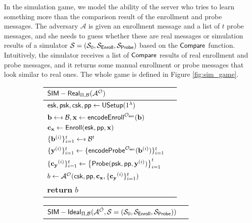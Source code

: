 In the simulation game, we model the ability of the server who tries to learn something more than the comparison result of the enrollment and probe messages. The adversary $\mathcal{A}$ is given an enrollment message and a list of $t$ probe messages, and she needs to guess whether these are real messages or simulation results of a simulator $\mathcal{S} = (\mathcal{S}_0, \mathcal{S}_{\sf Enroll}, \mathcal{S}_{\sf Probe})$ based on the $\sf Compare$ function. Intuitively, the simulator receives a list of $\sf Compare$ results of real enrollment and probe messages, and it returns some manual enrollment or probe messages that look similar to real ones. The whole game is defined in Figure \ref{fig:sim_game}.

\begin{figure}[h]
	\begin{center}

		\begin{subfigure}[t]{0.49\textwidth}
		\begin{tabular}{l c}
			${\sf SIM-Real}_{\Pi, \mathcal{B}}(\mathcal{A}^\mathcal{O})$\\

			\hline

			${\sf esk}, {\sf psk}, {\sf csk}, {\sf pp} \gets {\sf USetup}(1^\lambda)$ \\

			$ \mathbf{b} \getsdollar \mathcal{B}, \mathbf{x} \gets {\sf encodeEnroll}^{\mathcal{O}_{\sf aux}}(\mathbf{b})$ \\

			$\mathbf{c_x} \gets {\sf Enroll}({\sf esk}, {\sf pp}, \mathbf{x})$ \\

			$\{ \mathbf{b}^{(i)} \}_{i=1}^t \getsdollar \mathcal{B}^t$ \\ 

			$\{\mathbf{y}^{(i)}\}_{i=1}^t \gets \{{\sf encodeProbe}^{\mathcal{O}_{\sf aux}}(\mathbf{b}^{(i)})\}_{i=1}^t $ \\
			
			$\{ \mathbf{c_y}^{(i)} \}_{i=1}^t \gets \left\{ {\sf Probe}( {\sf psk}, {\sf pp}, \mathbf{y}^{(i)} ) \right \}_{i=1}^t$ \\

			$b \gets \mathcal{A}^{\mathcal{O}} ({\sf csk}, {\sf pp}, \mathbf{c_x}, \{\mathbf{c_y}^{(i)}\}_{i=1}^t )$ \\

			\textbf{return} $b$
			
		\end{tabular}
		\end{subfigure}
		\begin{subfigure}[t]{0.49\textwidth}
		\begin{tabular}{l c}
			${\sf SIM-Ideal}_{\Pi, \mathcal{B}}(\mathcal{A}^{\tilde{\mathcal{O}}}, \mathcal{S} = (\mathcal{S}_0, \mathcal{S}_{\sf Enroll}, \mathcal{S}_{\sf Probe}))$\\


\end{tabular}
\end{subfigure}
\end{center}
\end{figure}
